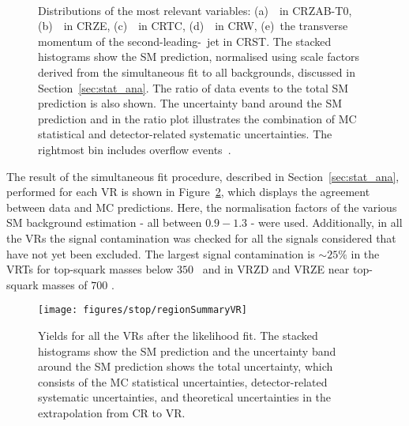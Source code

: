 			\begin{figure}[!htb]
			  \centering
		    \\
		    \caption{Distributions of the most relevant variables: (a)~\mttwoprime\ in CRZAB-T0, (b)~\metprime\ in CRZE, (c)~\rISR\ in CRTC, (d)~\mtbmax\ in CRW, (e)~the transverse momentum of the second-leading-\pT\ jet in CRST. The stacked histograms show the \ac{SM} prediction, normalised using scale factors derived from the simultaneous fit to all backgrounds, discussed in Section~\ref{sec:stat_ana}. The ratio of data events to the total \ac{SM} prediction is also shown. The uncertainty band around the \ac{SM} prediction and in the ratio plot illustrates the combination of \ac{MC} statistical and detector-related systematic uncertainties. The rightmost bin includes overflow events~\cite{stop0L}.}
		    \label{fig:CRs}
			\end{figure}

			The result of the simultaneous fit procedure, described in Section~\ref{sec:stat_ana}, performed for each \ac{VR} is shown in Figure~\ref{fig:VRs}, which displays the agreement between data and \ac{MC} predictions. Here, the normalisation factors of the various \ac{SM} background estimation - all between $0.9 - 1.3$ - were used. Additionally, in all the \acp{VR} the signal contamination was checked for all the signals considered that have not yet been excluded. The largest signal contamination is $\sim 25\%$ in the VRTs for top-squark masses below $350$ \GeV\ and in VRZD and VRZE near top-squark masses of $700$ \GeV.

			\begin{figure}[!htb]
			  \begin{center}
			    \texttt{[image: figures/stop/regionSummaryVR]}
			    \caption{Yields for all the \acp{VR} after the likelihood fit. The stacked histograms show the \ac{SM} prediction and the uncertainty band around the \ac{SM} prediction shows the total uncertainty, which consists of the \ac{MC} statistical uncertainties, detector-related systematic uncertainties, and theoretical uncertainties in the extrapolation from \ac{CR} to \ac{VR}.} 
			    \label{fig:VRs}
			  \end{center}
			\end{figure}


